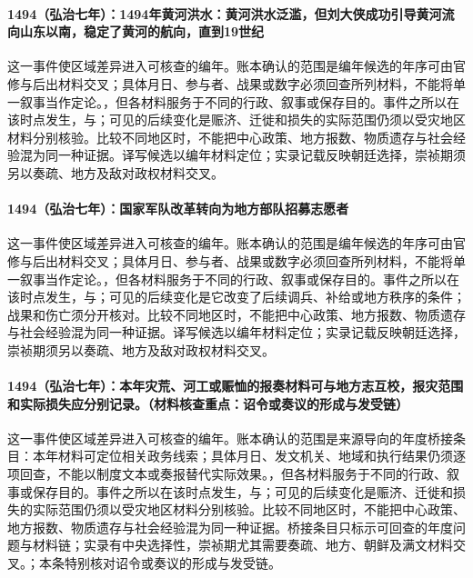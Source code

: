 \paragraph{1494（弘治七年）：1494年黄河洪水：黄河洪水泛滥，但刘大侠成功引导黄河流向山东以南，稳定了黄河的航向，直到19世纪} 这一事件使区域差异进入可核查的编年。账本确认的范围是编年候选的年序可由官修与后出材料交叉；具体月日、参与者、战果或数字必须回查所列材料，不能将单一叙事当作定论。，但各材料服务于不同的行政、叙事或保存目的。事件之所以在该时点发生，与；可见的后续变化是赈济、迁徙和损失的实际范围仍须以受灾地区材料分别核验。比较不同地区时，不能把中心政策、地方报数、物质遗存与社会经验混为同一种证据。译写候选以编年材料定位；实录记载反映朝廷选择，崇祯期须另以奏疏、地方及敌对政权材料交叉。

\paragraph{1494（弘治七年）：国家军队改革转向为地方部队招募志愿者} 这一事件使区域差异进入可核查的编年。账本确认的范围是编年候选的年序可由官修与后出材料交叉；具体月日、参与者、战果或数字必须回查所列材料，不能将单一叙事当作定论。，但各材料服务于不同的行政、叙事或保存目的。事件之所以在该时点发生，与；可见的后续变化是它改变了后续调兵、补给或地方秩序的条件；战果和伤亡须分开核对。比较不同地区时，不能把中心政策、地方报数、物质遗存与社会经验混为同一种证据。译写候选以编年材料定位；实录记载反映朝廷选择，崇祯期须另以奏疏、地方及敌对政权材料交叉。

\paragraph{1494（弘治七年）：本年灾荒、河工或赈恤的报奏材料可与地方志互校，报灾范围和实际损失应分别记录。（材料核查重点：诏令或奏议的形成与发受链）} 这一事件使区域差异进入可核查的编年。账本确认的范围是来源导向的年度桥接条目：本年材料可定位相关政务线索；具体月日、发文机关、地域和执行结果仍须逐项回查，不能以制度文本或奏报替代实际效果。，但各材料服务于不同的行政、叙事或保存目的。事件之所以在该时点发生，与；可见的后续变化是赈济、迁徙和损失的实际范围仍须以受灾地区材料分别核验。比较不同地区时，不能把中心政策、地方报数、物质遗存与社会经验混为同一种证据。桥接条目只标示可回查的年度问题与材料链；实录有中央选择性，崇祯期尤其需要奏疏、地方、朝鲜及满文材料交叉。；本条特别核对诏令或奏议的形成与发受链。
